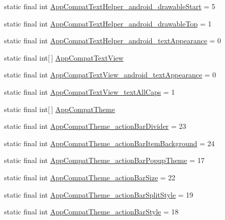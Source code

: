 \begin{CompactItemize}
\item 
static final int \hyperlink{classandroid_1_1support_1_1v4_1_1_r_1_1styleable_bd3630b47fe4b2f49803b58778a2decc}{AppCompatTextHelper\_\-android\_\-drawableStart} = 5
\item 
static final int \hyperlink{classandroid_1_1support_1_1v4_1_1_r_1_1styleable_66f496b911feca00e39235282107091b}{AppCompatTextHelper\_\-android\_\-drawableTop} = 1
\item 
static final int \hyperlink{classandroid_1_1support_1_1v4_1_1_r_1_1styleable_42af8564f82204922d5e9775f92bb815}{AppCompatTextHelper\_\-android\_\-textAppearance} = 0
\item 
static final int\mbox{[}$\,$\mbox{]} \hyperlink{classandroid_1_1support_1_1v4_1_1_r_1_1styleable_2000bab6df68054d5e2a8e1f43e47fc8}{AppCompatTextView}
\item 
static final int \hyperlink{classandroid_1_1support_1_1v4_1_1_r_1_1styleable_2d9b7b115f3b8c8fd3fd2393e77a2fc0}{AppCompatTextView\_\-android\_\-textAppearance} = 0
\item 
static final int \hyperlink{classandroid_1_1support_1_1v4_1_1_r_1_1styleable_e0710b843567b5d6b3777bcbd6456ac4}{AppCompatTextView\_\-textAllCaps} = 1
\item 
static final int\mbox{[}$\,$\mbox{]} \hyperlink{classandroid_1_1support_1_1v4_1_1_r_1_1styleable_0873e92ba21076bb5a4aeadeb7f5779f}{AppCompatTheme}
\item 
static final int \hyperlink{classandroid_1_1support_1_1v4_1_1_r_1_1styleable_a5d8289303e56212e5d12315d20673e4}{AppCompatTheme\_\-actionBarDivider} = 23
\item 
static final int \hyperlink{classandroid_1_1support_1_1v4_1_1_r_1_1styleable_2f97502dea4ecbf53eeb7b290f197fed}{AppCompatTheme\_\-actionBarItemBackground} = 24
\item 
static final int \hyperlink{classandroid_1_1support_1_1v4_1_1_r_1_1styleable_b8e3e3d79004f9d863d1f02f888e17e8}{AppCompatTheme\_\-actionBarPopupTheme} = 17
\item 
static final int \hyperlink{classandroid_1_1support_1_1v4_1_1_r_1_1styleable_ee6703791177fb18457f6fa90659aad3}{AppCompatTheme\_\-actionBarSize} = 22
\item 
static final int \hyperlink{classandroid_1_1support_1_1v4_1_1_r_1_1styleable_45e5a64b1e5eae0d6bd7742eb43a7c56}{AppCompatTheme\_\-actionBarSplitStyle} = 19
\item 
static final int \hyperlink{classandroid_1_1support_1_1v4_1_1_r_1_1styleable_c3f864960381c66a243e748e86583219}{AppCompatTheme\_\-actionBarStyle} = 18

\end{CompactItemize}
